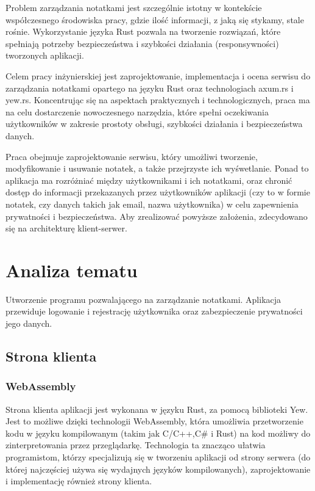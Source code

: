 \documentclass[a4paper,twoside,12pt]{book}
\begin{document}
\hfill\break
Problem zarządzania notatkami jest szczególnie istotny w kontekście współczesnego środowiska pracy, gdzie ilość informacji, z jaką się stykamy, stale rośnie. Wykorzystanie języka Rust pozwala na tworzenie rozwiązań, które spełniają potrzeby bezpieczeństwa i szybkości działania (responsywności) tworzonych aplikacji. 

\hfill\break
Celem pracy inżynierskiej jest zaprojektowanie, implementacja i ocena serwisu do zarządzania notatkami opartego na języku Rust oraz technologiach axum.rs i yew.rs. Koncentrując się na aspektach praktycznych i technologicznych, praca ma na celu dostarczenie nowoczesnego narzędzia, które spełni oczekiwania użytkowników w zakresie prostoty obsługi, szybkości działania i bezpieczeństwa danych.

\hfill\break
Praca obejmuje zaprojektowanie serwisu, który umożliwi tworzenie, modyfikowanie i usuwanie notatek, a także przejrzyste ich wyśwetlanie. Ponad to aplikacja ma rozróżniać między użytkownikami i ich notatkami, oraz chronić dostęp do informacji przekazanych przez użytkowników aplikacji (czy to w formie notatek, czy danych takich jak email, nazwa użytkownika) w celu zapewnienia prywatności i bezpieczeństwa. Aby zrealizować powyższe założenia, zdecydowano się na architekturę klient-serwer.

\chapter{Analiza tematu}

Utworzenie programu pozwalającego na zarządzanie notatkami. Aplikacja przewiduje
logowanie i rejestrację użytkownika oraz zabezpieczenie prywatności jego danych.

\section{Strona klienta}

\subsection{WebAssembly}

Strona klienta aplikacji jest wykonana w języku Rust, za pomocą biblioteki 
Yew. Jest to możliwe dzięki technologii WebAssembly, która umożliwia 
przetworzenie kodu w języku kompilowanym (takim jak C/C++,C\# i Rust) na 
kod możliwy do zinterpretowania przez przeglądarkę. Technologia ta znacząco 
ułatwia programistom, którzy specjalizują się w tworzeniu aplikacji od strony
serwera (do której najczęściej używa się wydajnych języków kompilowanych),
zaprojektowanie i implementację również strony klienta.
\end{document}
